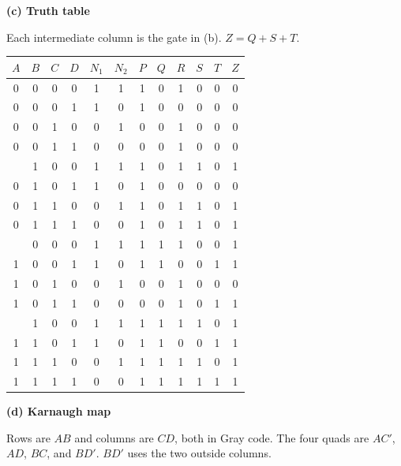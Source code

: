 \documentclass[10pt]{article}
\newcommand{\task}[1]{\par\vspace{2pt}\noindent\textbf{#1}\par\vspace{1pt}}
\begin{document}
\task{(c) \quad Truth table}

Each intermediate column is the gate in (b). \(Z = Q + S + T\).

\begin{center}
\small
\begin{tabular}{cccc ccccccc c}
\toprule
\(A\) & \(B\) & \(C\) & \(D\) & \(N_1\) & \(N_2\) & \(P\) & \(Q\) & \(R\) & \(S\) & \(T\) & \(Z\) \\
\midrule
0 & 0 & 0 & 0 & 1 & 1 & 1 & 0 & 1 & 0 & 0 & 0 \\
0 & 0 & 0 & 1 & 1 & 0 & 1 & 0 & 0 & 0 & 0 & 0 \\
0 & 0 & 1 & 0 & 0 & 1 & 0 & 0 & 1 & 0 & 0 & 0 \\
0 & 0 & 1 & 1 & 0 & 0 & 0 & 0 & 1 & 0 & 0 & 0 \\
\addlinespace
0 & 1 & 0 & 0 & 1 & 1 & 1 & 0 & 1 & 1 & 0 & 1 \\
0 & 1 & 0 & 1 & 1 & 0 & 1 & 0 & 0 & 0 & 0 & 0 \\
0 & 1 & 1 & 0 & 0 & 1 & 1 & 0 & 1 & 1 & 0 & 1 \\
0 & 1 & 1 & 1 & 0 & 0 & 1 & 0 & 1 & 1 & 0 & 1 \\
\addlinespace
1 & 0 & 0 & 0 & 1 & 1 & 1 & 1 & 1 & 0 & 0 & 1 \\
1 & 0 & 0 & 1 & 1 & 0 & 1 & 1 & 0 & 0 & 1 & 1 \\
1 & 0 & 1 & 0 & 0 & 1 & 0 & 0 & 1 & 0 & 0 & 0 \\
1 & 0 & 1 & 1 & 0 & 0 & 0 & 0 & 1 & 0 & 1 & 1 \\
\addlinespace
1 & 1 & 0 & 0 & 1 & 1 & 1 & 1 & 1 & 1 & 0 & 1 \\
1 & 1 & 0 & 1 & 1 & 0 & 1 & 1 & 0 & 0 & 1 & 1 \\
1 & 1 & 1 & 0 & 0 & 1 & 1 & 1 & 1 & 1 & 0 & 1 \\
1 & 1 & 1 & 1 & 0 & 0 & 1 & 1 & 1 & 1 & 1 & 1 \\
\bottomrule
\end{tabular}
\end{center}

\task{(d) \quad Karnaugh map}

Rows are \(AB\) and columns are \(CD\), both in Gray code. The four quads are \(AC'\), \(AD\), \(BC\), and \(BD'\). \(BD'\) uses the two outside columns.
\end{document}
